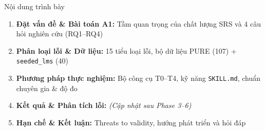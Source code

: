 \documentclass[aspectratio=169,10pt]{beamer}
\begin{document}
\begin{frame}[plain]
  \titlepage
\end{frame}

\begin{frame}{Nội dung trình bày}
  \begin{enumerate}
    \item \textbf{Đặt vấn đề \& Bài toán A1:} Tầm quan trọng của chất lượng SRS và 4 câu hỏi nghiên cứu (RQ1--RQ4)
    \item \textbf{Phân loại lỗi \& Dữ liệu:} 15 tiểu loại lỗi, bộ dữ liệu PURE (107) + \texttt{seeded\_lms} (40)
    \item \textbf{Phương pháp thực nghiệm:} Bộ công cụ T0--T4, kỹ năng \texttt{SKILL.md}, chuẩn chuyên gia \& độ đo
    \item \textbf{Kết quả \& Phân tích lỗi:} \textit{(Cập nhật sau Phase 3--6)}
    \item \textbf{Hạn chế \& Kết luận:} Threats to validity, hướng phát triển và hỏi đáp
  \end{enumerate}
\end{frame}
\end{document}
